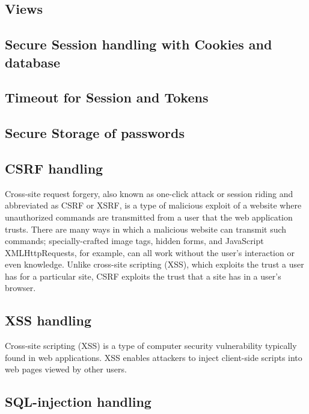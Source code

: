 \documentclass[12pt,a4paper]{article}
\begin{document}
\begin{flushleft}
	\subsection {Views}
		
	\subsection{Secure Session handling with Cookies and database}
	
	\subsection{Timeout for Session and Tokens}
	
	\subsection{Secure Storage of passwords}
	
	\subsection{CSRF handling}
	
	\begin{flushleft}
		Cross-site request forgery, also known as one-click attack or session riding and abbreviated as CSRF or XSRF, is a type of malicious exploit of a website where unauthorized commands are transmitted from a user that the web application trusts. There are many ways in which a malicious website can transmit such commands; specially-crafted image tags, hidden forms, and JavaScript XMLHttpRequests, for example, can all work without the user's interaction or even knowledge. Unlike cross-site scripting (XSS), which exploits the trust a user has for a particular site, CSRF exploits the trust that a site has in a user's browser.
	\end{flushleft}
	
	\subsection{XSS handling}
	
	\begin{flushleft}
		Cross-site scripting (XSS) is a type of computer security vulnerability typically found in web applications. XSS enables attackers to inject client-side scripts into web pages viewed by other users. 
	\end{flushleft}
	
	\subsection{SQL-injection handling}
	

\end{flushleft}
\end{document}

